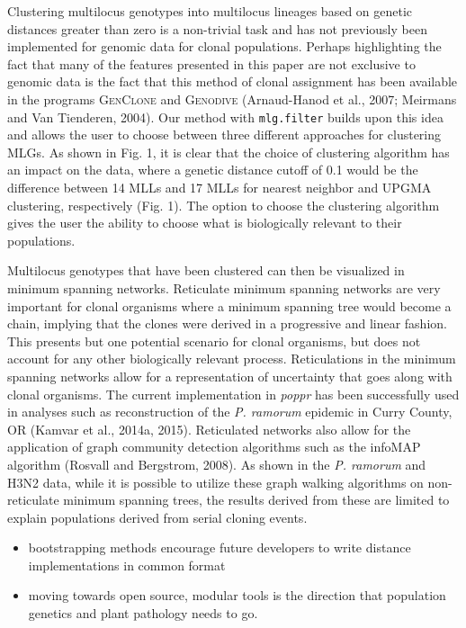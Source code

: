 \documentclass{frontiersSCNS} %
\begin{document}
Clustering multilocus genotypes into multilocus lineages based on
genetic distances greater than zero is a non-trivial task and has not
previously been implemented for genomic data for clonal populations.
Perhaps highlighting the fact that many of the features presented in
this paper are not exclusive to genomic data is the fact that this
method of clonal assignment has been available in the programs
\textsc{GenClone} and \textsc{Genodive} (Arnaud-Hanod et al., 2007;
Meirmans and Van Tienderen, 2004). Our method with \texttt{mlg.filter}
builds upon this idea and allows the user to choose between three
different approaches for clustering MLGs. As shown in Fig. 1, it is
clear that the choice of clustering algorithm has an impact on the data,
where a genetic distance cutoff of 0.1 would be the difference between
14 MLLs and 17 MLLs for nearest neighbor and UPGMA clustering,
respectively (Fig. 1). The option to choose the clustering algorithm
gives the user the ability to choose what is biologically relevant to
their populations.

Multilocus genotypes that have been clustered can then be visualized in
minimum spanning networks. Reticulate minimum spanning networks are very
important for clonal organisms where a minimum spanning tree would
become a chain, implying that the clones were derived in a progressive
and linear fashion. This presents but one potential scenario for clonal
organisms, but does not account for any other biologically relevant
process. Reticulations in the minimum spanning networks allow for a
representation of uncertainty that goes along with clonal organisms. The
current implementation in \emph{poppr} has been successfully used in
analyses such as reconstruction of the \emph{P. ramorum} epidemic in
Curry County, OR (Kamvar et al., 2014a, 2015). Reticulated networks also
allow for the application of graph community detection algorithms such
as the infoMAP algorithm (Rosvall and Bergstrom, 2008). As shown in the
\emph{P. ramorum} and H3N2 data, while it is possible to utilize these
graph walking algorithms on non-reticulate minimum spanning trees, the
results derived from these are limited to explain populations derived
from serial cloning events.

\begin{itemize}
\itemsep1pt\parskip0pt
\item
  bootstrapping methods encourage future developers to write distance
  implementations in common format
\item
  moving towards open source, modular tools is the direction that
  population genetics and plant pathology needs to go.
\end{itemize}
\end{document}
